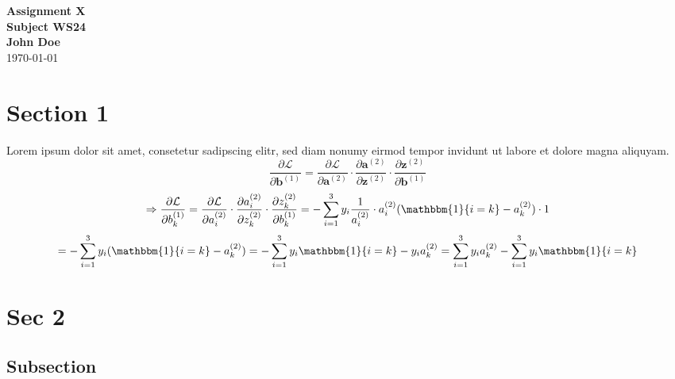 \documentclass[a4paper,11pt]{article}
\begin{document}
	
	\begin{center}
		{\fontsize{18}{10}\selectfont \textbf{Assignment X}} \\
		\vspace{0.3cm}
		{\textbf{Subject WS24}} \\
		\vspace{0.2cm}
		\textbf{John Doe} \\
		\vspace{0.2cm}
		\today
	\end{center}
	
	\vspace{0.3cm}
	
\section{Section 1}
	
Lorem ipsum dolor sit amet, consetetur sadipscing elitr, sed diam nonumy eirmod tempor invidunt ut labore et dolore magna aliquyam.
 	\[ \frac{\partial\mathcal{L}}{\partial \mathbf{b}^{(1)}} =  
 \frac{\partial\mathcal{L}}{\partial \mathbf{a}^{(2)}} \cdot
 \frac{\partial \mathbf{a}^{(2)}}{\partial \mathbf{z}^{(2)}} \cdot
 \frac{\partial \mathbf{z}^{(2)}}{\partial \mathbf{b}^{(1)}}\]
 \[ \Rightarrow
 \frac{\partial \mathcal{L}}{\partial b_k^{(1)}} = \frac{\partial \mathcal{L}}{\partial a_i^{(2)}} \cdot \frac{\partial a_i^{(2)}}{\partial z_k^{(2)}} \cdot \frac{\partial z_k^{(2)}}{\partial b_k^{(1)}} = - \sum_{i = 1}^{3} y_i\frac{1}{a_i^{(2)}} \cdot a_i^{(2)}  (\mathbbm{1}\{i = k\}-a_k^{(2)}) \cdot 1
 \]
 \[ = - \sum_{i = 1}^{3} y_i (\mathbbm{1}\{i = k\}-a_k^{(2)}) = - \sum_{i = 1}^{3} y_i\mathbbm{1}\{i = k\}-y_ia_k^{(2)} = \sum_{i = 1}^{3}y_ia_k^{(2)} - \sum_{i = 1}^{3} y_i\mathbbm{1}\{i = k\} \]
 
\section{Sec 2}

\subsection{Subsection}
\end{document}
